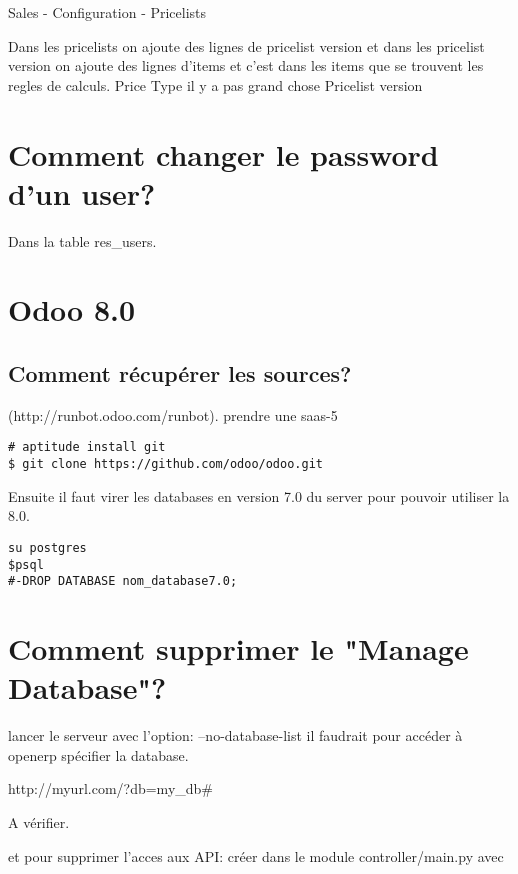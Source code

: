 \documentclass[12pt,a4paper]{article}
\begin{document}
Sales - Configuration - Pricelists

Dans les pricelists on ajoute des lignes de pricelist version  et dans les pricelist version on ajoute des lignes d'items et c'est dans les items que se trouvent les regles de calculs.
Price Type il y a pas grand chose
Pricelist version

\section{Comment changer le password d'un user?}
\label{sec:change_password}

Dans la table res_users.

\section{Odoo 8.0}
\label{sec:8.0}

\subsection{Comment récupérer les sources?}
\label{sec:get_src}

(http://runbot.odoo.com/runbot). prendre une saas-5

\begin{verbatim}
# aptitude install git
$ git clone https://github.com/odoo/odoo.git
\end{verbatim}


Ensuite il faut virer les databases en version 7.0 du server pour pouvoir utiliser la 8.0.

\begin{verbatim}
su postgres
$psql
#-DROP DATABASE nom_database7.0;
\end{verbatim}

\section{Comment supprimer le "Manage Database"?}
\label{sec:del_manage_database}

lancer le serveur avec l'option: --no-database-list
il faudrait pour accéder à openerp spécifier la database.

http://myurl.com/?db=my_db#

A vérifier.

et pour supprimer l'acces aux API: créer dans le module controller/main.py avec 
\end{document}
